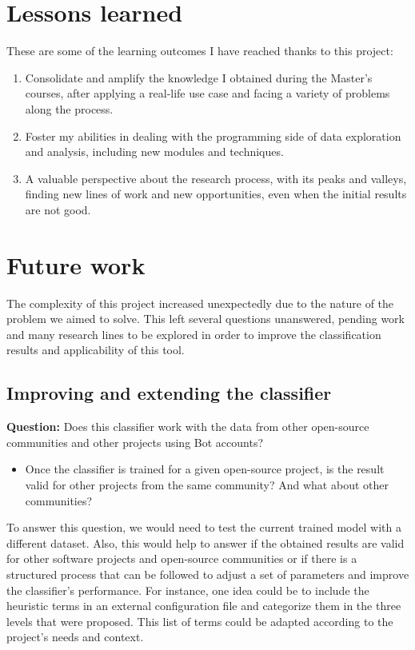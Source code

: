 \documentclass[a4paper, 12pt]{book}
\begin{document}
\section{Lessons learned}
\label{sec:lessons-learned}

These are some of the learning outcomes I have reached thanks to this project:

\begin{enumerate}
  \item Consolidate and amplify the knowledge I obtained during the Master's courses, after applying a real-life use case and facing a variety of problems along the process.
  \item Foster my abilities in dealing with the programming side of data exploration and analysis, including new modules and techniques.
  \item A valuable perspective about the research process, with its peaks and valleys, finding new lines of work and new opportunities, even when the initial results are not good.
\end{enumerate}

\section{Future work}
\label{sec:future-work}

The complexity of this project increased unexpectedly due to the nature of the problem we aimed to solve. This left several questions unanswered, pending work and many research lines to be explored in order to improve the classification results and applicability of this tool.

\subsection{Improving and extending the classifier}

\textbf{Question:} Does this classifier work with the data from other open-source communities and other projects using Bot accounts?

\begin{itemize}
    \item Once the classifier is trained for a given open-source project, is the result valid for other projects from the same community? And what about other communities?
\end{itemize}

To answer this question, we would need to test the current trained model with a different dataset. Also, this would help to answer if the obtained results are valid for other software projects and open-source communities or if there is a structured process that can be followed to adjust a set of parameters and improve the classifier's performance. For instance, one idea could be to include the heuristic terms in an external configuration file and categorize them in the three levels that were proposed. This list of terms could be adapted according to the project's needs and context.
\end{document}
